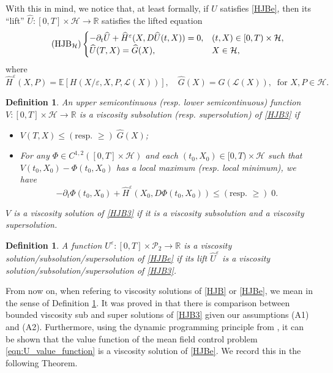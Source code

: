 \documentclass[reqno,11pt]{amsart}
\newtheorem{definition}[theorem]{Definition}
\newtheorem{remark}[theorem]{Remark}
\numberwithin{equation}{section}
\newcommand{\be}{\begin{equation}}
\newcommand{\ee}{\end{equation}}
\newcommand{\R}{\mathbb{R}} %
\newcommand{\e}{\varepsilon}
\newcommand{\nd}{\noindent}
\renewcommand{\hat}{\widehat}
\begin{document}
\nd
With this in mind, we notice that, at least formally, if $U$ satisfies \eqref{HJBe}, then its ``lift'' $\hat{U}:[0,T]\times\mathcal{H}\rightarrow \R$ satisfies the lifted equation
\be\label{HJB3}\tag{$\mathrm{HJB}_\mathcal{H}$}
\begin{cases}
    -\partial_t \hat{U} +\hat{H}^\e(X,D\hat{U}(t,X))=0, &(t,X)\in [0,T)\times \mathcal{H},\\
    \hat{U}(T,X)=\hat{G}(X), &X\in\mathcal{H},
\end{cases}
\ee
where
$$\hat{H}^\e(X,P)=\mathbb{E}[H(X/\e,X,P,\mathcal{L}(X))],\quad \hat{G}(X)=G(\mathcal{L}(X)),\;\; \text{for }X,P\in \mathcal{H}.$$

\begin{definition}\label{L-visc}
    An upper semicontinuous (resp. lower semicontinuous) function $V:[0,T]\times \mathcal{H}\rightarrow \R$ is a viscosity subsolution (resp. supersolution) of \eqref{HJB3} if
    \begin{itemize}
        \item $V(T,X)\le (\text{resp. }\ge)\; \hat{G}(X)$;
        \item For any $\Phi\in C^{1,2}([0,T]\times\mathcal{H})$ and each $(t_0,X_0)\in [0,T)\times \mathcal{H}$ such that $V(t_0,X_0)-\Phi(t_0,X_0)$ has a local maximum (resp. local minimum), we have
        $$-\partial_t \Phi(t_0,X_0)+\hat{H}^\e(X_0,D\Phi(t_0,X_0))\le (\text{resp. }\ge)\; 0.$$
    \end{itemize}
    $V$ is a viscosity solution of \eqref{HJB3} if it is a viscosity subsolution and a viscosity supersolution.
\end{definition}


\begin{definition}\label{visc.}
    A function $U^\e\colon [0,T]\times\mathcal{P}_2\rightarrow \R$ is a viscosity solution/subsolution/supersolution of \eqref{HJBe} if its lift $\hat{U}^\e$ is a viscosity solution/subsolution/supersolution of \eqref{HJB3}.
\end{definition}
\vspace{1mm}

\nd
From now on, when refering to viscosity solutions of \eqref{HJB} or \eqref{HJBe}, we mean in the sense of Definition \ref{visc.}.
It was proved in \cite[Theorem 7.4]{gangbo2021finite} that there is comparison between bounded viscosity sub and super solutions of \eqref{HJB3} given our assumptions (A1) and (A2). Furthermore, using the dynamic programming principle from \cite{djete2022mckean1}, it can be shown that the value function of the mean field control problem \eqref{eqn:U_value_function} is a viscosity solution of \eqref{HJBe}. We record this in the following Theorem.
\end{document}
